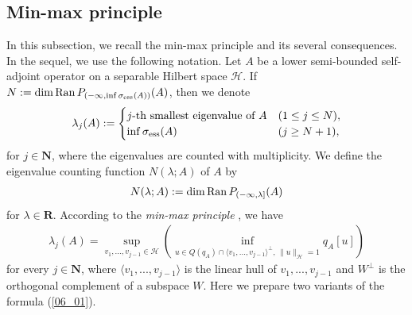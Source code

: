 \documentclass[12pt,a4paper]{article}
\def\Ran{\mathop{\rm Ran}\nolimits}
\begin{document}
\subsection{Min-max principle}
In this subsection,
we recall the min-max principle and its several consequences.
In the sequel, we use the following notation.
Let $A$ be a lower semi-bounded self-adjoint operator 
on a separable Hilbert space $\mathcal{H}$.
If $N:=\dim \Ran P_{(-\infty,\inf \sigma_{\rm ess}(A))}(A)$,
then we denote
\begin{align*}
 \lambda_j(A)
:=
\begin{cases}
 \mbox{$j$-th smallest eigenvalue of $A$}&(1\leq j\leq N),\\
\inf \sigma_{\rm ess}(A)&(j\geq N+1),
\end{cases}
\end{align*}
for $j\in \mathbf{N}$,
where the eigenvalues are counted with multiplicity.
We define the eigenvalue counting function $N(\lambda;A)$ of $A$ by
\begin{align*}
 N(\lambda;A):=\dim\Ran P_{(-\infty,\lambda]}(A)
\end{align*}
for $\lambda\in \mathbf{R}$.
According to the \textit{min-max principle} \cite[Theorem XIII.1,2]{Re-Si4},
we have
\begin{align}
 \label{06_01}
\lambda_j(A)
=\sup_{v_1,...,v_{j-1}\in \mathcal{H}}
\left(
\inf_{u\in Q(q_A)\cap 
\langle v_1,...,v_{j-1}\rangle^{\bot}
,\, \|u\|_\mathcal{H}=1}q_A[u]
\right)
\end{align}
for every $j\in \mathbf{N}$, where 
$\langle v_1,...,v_{j-1}\rangle$
is the linear hull of 
$v_1,...,v_{j-1}$
and $W^\bot$ is the orthogonal complement 
of a subspace $W$.
Here we prepare two variants of the formula (\ref{06_01}).
\end{document}
